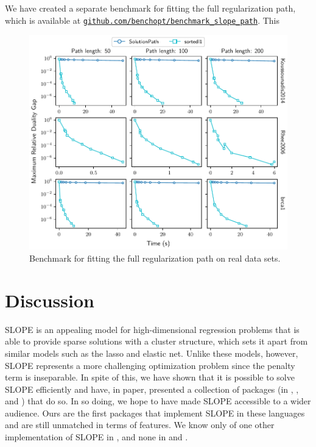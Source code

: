 \documentclass[article]{jss}
\makeatletter
\let\natwidth\Gin@nat@width
\newcommand{\myurl}[1]{\href{https://#1}{\nolinkurl{#1}}}
\makeatother
\begin{document}
We have created a separate benchmark for fitting the full regularization path,
which is available at \myurl{github.com/benchopt/benchmark\_slope\_path}. This

\begin{figure}[htpb]
  \centering
  \includegraphics[width=\natwidth]{images/benchmark_path_real.pdf}
  \caption{%
    Benchmark for fitting the full regularization path on real data sets.
  }
  \label{fig:real-data-path}
\end{figure}

\section{Discussion}

SLOPE is an appealing model for high-dimensional regression problems that is
able to provide sparse solutions with a cluster structure, which sets it apart
from similar models such as the lasso and elastic net. Unlike these models,
however, SLOPE represents a more challenging optimization problem since the
penalty term is inseparable. In spite of this, we have shown that it is
possible to solve SLOPE efficiently and have, in paper, presented a collection
of packages (in , , and ) that do
so. In so doing, we hope to have made SLOPE accessible to a wider audience.
Ours are the first packages that implement SLOPE in these languages and
are still unmatched in terms of features. We know only of one other
implementation of SLOPE in , and none in  and
.
\end{document}

